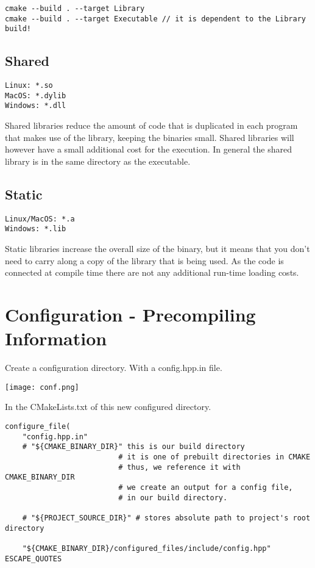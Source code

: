 \documentclass[openany]{report}
\begin{document}
\begin{verbatim}
cmake --build . --target Library
cmake --build . --target Executable // it is dependent to the Library build!
\end{verbatim}

\subsection{Shared}

\begin{verbatim}
Linux: *.so
MacOS: *.dylib
Windows: *.dll
\end{verbatim}

Shared libraries reduce the amount of code that is duplicated in each program that makes use of the library, keeping the binaries small.
Shared libraries will however have a small additional cost for the execution.
In general the shared library is in the same directory as the executable.

\subsection{Static}

\begin{verbatim}
Linux/MacOS: *.a
Windows: *.lib
\end{verbatim}

Static libraries increase the overall size of the binary, but it means that you don't need to carry along a copy of the library that is being used.
As the code is connected at compile time there are not any additional run-time loading costs.

\section{Configuration - Precompiling Information}

Create a configuration directory. With a config.hpp.in file.

\begin{center}
    \texttt{[image: conf.png]}
\end{center}

In the CMakeLists.txt of this new configured directory.

\begin{verbatim}
configure_file(
    "config.hpp.in"
    # "${CMAKE_BINARY_DIR}" this is our build directory
                          # it is one of prebuilt directories in CMAKE
                          # thus, we reference it with CMAKE_BINARY_DIR
                          # we create an output for a config file, 
                          # in our build directory.

    # "${PROJECT_SOURCE_DIR}" # stores absolute path to project's root directory

    "${CMAKE_BINARY_DIR}/configured_files/include/config.hpp" ESCAPE_QUOTES 
\end{verbatim}
\end{document}
